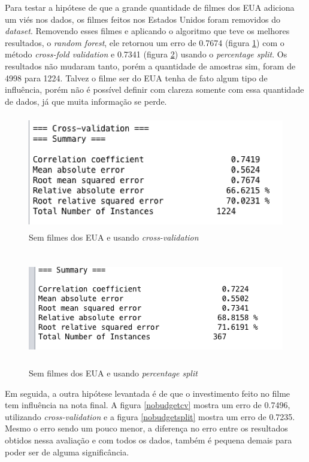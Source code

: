 Para testar a hipótese de que a grande quantidade de filmes dos EUA adiciona um viés nos dados, os filmes feitos nos Estados Unidos foram removidos do \textit{dataset}. Removendo esses filmes e aplicando o algoritmo que teve os melhores resultados, o \textit{random forest}, ele retornou um erro de 0.7674 (figura \ref{nousacv}) com o método \textit{cross-fold validation} e 0.7341 (figura \ref{nousasplit}) usando o \textit{percentage split}. Os resultados não mudaram tanto, porém a quantidade de amostras sim, foram de 4998 para 1224. Talvez o filme ser do EUA tenha de fato algum tipo de influência, porém não é possível definir com clareza somente com essa quantidade de dados, já que muita informação se perde.

\begin{figure}[H]
\centering
\includegraphics[height=5cm]{imagens/sem_usa_cv.png}
\caption{Sem filmes dos EUA e usando \textit{cross-validation}}
\label{nousacv}
\end{figure}

\begin{figure}[H]
\centering
\includegraphics[height=5cm]{imagens/sem_usa_split.png}
\caption{Sem filmes dos EUA e usando \textit{percentage split}}
\label{nousasplit}
\end{figure}


Em seguida, a outra hipótese levantada é de que o investimento feito no filme tem influência na nota final. A figura \ref{nobudgetcv} mostra um erro de 0.7496, utilizando \textit{cross-validation} e a figura \ref{nobudgetsplit} mostra um erro de 0.7235. Mesmo o erro sendo um pouco menor, a diferença no erro entre os resultados obtidos nessa avaliação e com todos os dados, também é pequena demais para poder ser de alguma significância.

